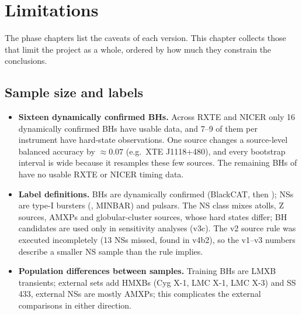 \chapter{Limitations}\label{ch:limitations}
The phase chapters list the caveats of each version. This chapter collects those that limit the project as a whole, ordered by
how much they constrain the conclusions.

\section{Sample size and labels}
\begin{itemize}
\item \textbf{Sixteen dynamically confirmed BHs.} Across RXTE and NICER only 16 dynamically confirmed BHs have usable data, and 7--9 of
them per instrument have hard-state observations. One source changes a source-level balanced accuracy by $\approx0.07$
(e.g.\ XTE J1118+480), and every bootstrap interval is wide because it resamples these few sources. The remaining BHs of
\citet{Marcel2026} have no usable RXTE or NICER timing data.
\item \textbf{Label definitions.} BHs are dynamically confirmed (BlackCAT, then \citealt{Marcel2026}); NSs are type-I bursters
(\citealt{Galloway2008}, MINBAR) and pulsars. The NS class mixes atolls, Z sources, AMXPs and globular-cluster sources, whose hard
states differ; BH candidates are used only in sensitivity analyses (v3c). The v2 source rule was executed incompletely (13 NSs missed,
found in v4b2), so the v1--v3 numbers describe a smaller NS sample than the rule implies.
\item \textbf{Population differences between samples.} Training BHs are LMXB transients; external sets add HMXBs (Cyg X-1, LMC X-1, LMC X-3)
and SS 433, external NSs are mostly AMXPs; this complicates the external comparisons in either direction.
\end{itemize}

